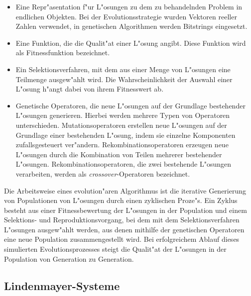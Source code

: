 \begin{itemize}

\item Eine Repr"asentation f"ur L"osungen zu dem zu behandelnden Problem in endlichen Objekten.
    Bei der Evolutionsstrategie \cite{Rechenberg} wurden Vektoren reeller Zahlen verwendet, in
    genetischen Algorithmen \cite{Goldberg89} werden Bitstrings eingesetzt.

\item Eine Funktion, die die Qualit"at einer L"osung angibt. Diese Funktion wird als Fitnessfunktion
    bezeichnet.

\item Ein Selektionsverfahren, mit dem aus einer Menge von L"osungen eine Teilmenge ausgew"ahlt wird.
    Die Wahrscheinlichkeit der Auswahl einer L"osung h"angt dabei von ihrem Fitnesswert ab.

\item Genetische Operatoren, die neue L"osungen auf der Grundlage bestehender L"osungen generieren. Hierbei werden
    mehrere Typen von Operatoren unterschieden. Mutationsoperatoren erstellen neue L"osungen auf der
    Grundlage einer bestehenden L"osung, indem sie einzelne Komponenten zufallsgesteuert ver"andern.
    Rekombinationsoperatoren erzeugen neue L"osungen durch die Kombination von Teilen mehrerer bestehender L"osungen.
    Rekombinationsoperatoren, die zwei bestehende L"osungen verarbeiten, werden als \textsl{crossover}-Operatoren
    bezeichnet.

\end{itemize}

Die Arbeitsweise eines evolution"aren Algorithmus ist die iterative Generierung von Populationen von L"osungen
durch einen zyklischen Proze"s. Ein Zyklus besteht aus einer Fitnessbewertung der L"osungen in der Population und
einem Selektions- und Reproduktionsvorgang, bei dem mit dem Selektionsverfahren L"osungen ausgew"ahlt werden,
aus denen mithilfe der genetischen Operatoren eine neue Population zusammengestellt wird. Bei erfolgreichem
Ablauf dieses simulierten Evolutionsprozesses steigt die Qualit"at der L"osungen in der Population von Generation
zu Generation.


\subsection{Lindenmayer-Systeme}


